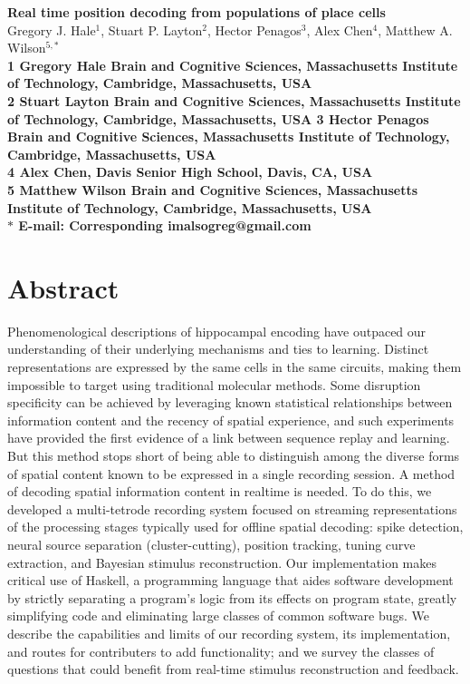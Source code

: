 \documentclass[10pt]{article}
\date{}
\begin{document}
\begin{flushleft}
{\Large
\textbf{Real time position decoding from populations of place cells}
}
\\
Gregory J. Hale$^{1}$, 
Stuart P. Layton$^{2}$, 
Hector Penagos$^{3}$, 
Alex Chen$^{4}$,
Matthew A. Wilson$^{5,\ast}$
\\
\bf{1} Gregory Hale Brain and Cognitive Sciences, Massachusetts Institute of Technology, Cambridge, Massachusetts, USA
\\
\bf{2} Stuart Layton Brain and Cognitive Sciences, Massachusetts Institute of Technology, Cambridge, Massachusetts, USA
\bf{3} Hector Penagos Brain and Cognitive Sciences, Massachusetts Institute of Technology, Cambridge, Massachusetts, USA
\\
\bf{4} Alex Chen, Davis Senior High School, Davis, CA, USA
\\
\bf{5} Matthew Wilson Brain and Cognitive Sciences, Massachusetts Institute of Technology, Cambridge, Massachusetts, USA
\\
$\ast$ E-mail: Corresponding imalsogreg@gmail.com
\end{flushleft}

\section*{Abstract}
Phenomenological descriptions of hippocampal encoding have outpaced our understanding of their underlying mechanisms and ties to learning. Distinct representations are expressed by the same cells in the same circuits, making them impossible to target using traditional molecular methods.  Some disruption specificity can be achieved by leveraging known statistical relationships between information content and the recency of spatial experience, and such experiments have provided the first evidence of a link between sequence replay and learning.  But this method stops short of being able to distinguish among the diverse forms of spatial content known to be expressed in a single recording session.
A method of decoding spatial information content in realtime is needed. To do this, we developed a multi-tetrode recording system focused on streaming representations of the processing stages typically used for offline spatial decoding: spike detection, neural source separation (cluster-cutting), position tracking, tuning curve extraction, and Bayesian stimulus reconstruction.  Our implementation makes critical use of Haskell, a programming language that aides software development by strictly separating a program's logic from its effects on program state, greatly simplifying code and eliminating large classes of common software bugs.  We describe the capabilities and limits of our recording system, its implementation, and routes for contributers to add functionality; and we survey the classes of questions that could benefit from real-time stimulus reconstruction and feedback.
\end{document}
